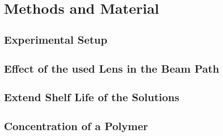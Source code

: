 \chapter{Methods and Material}
\label{chap:methods}

\section{Experimental Setup}
\label{sec:setup}

\section{Effect of the used Lens in the Beam Path}
\label{sec:effect}

\section{Extend Shelf Life of the Solutions}
\label{sec:lifetime}

\section{Concentration of a Polymer}
\label{sec:concentration}
